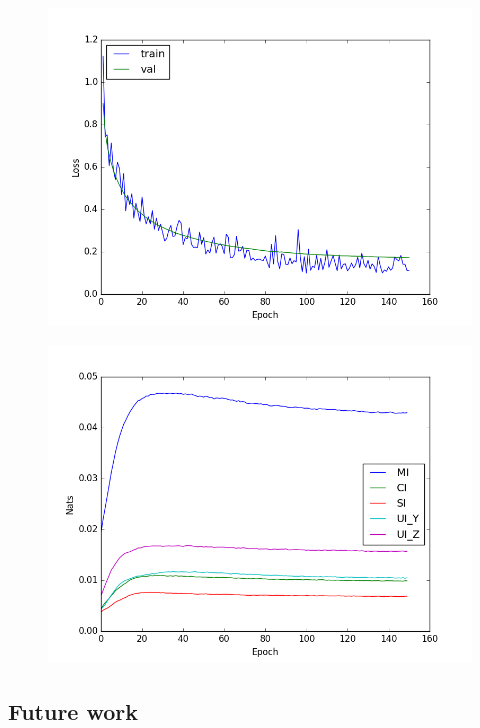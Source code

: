 \documentclass[12pt]{article}
\begin{document}
\begin{figure} [h]
\begin{center}
\includegraphics[width=.9\textwidth]{neural-net-loss}
\caption{}
\label{fig:neural-net-loss}
\end{center}
\end{figure}

\begin{figure} [h]
\begin{center}
\includegraphics[width=.9\textwidth]{neural-net-pid}
\caption{}
\label{fig:neural-net-pid}
\end{center}
\end{figure}

\cite{it-neural-nets}
\cite{binary-nets}
\cite{mnistlecun}

\subsection{Future work}
\end{document}
